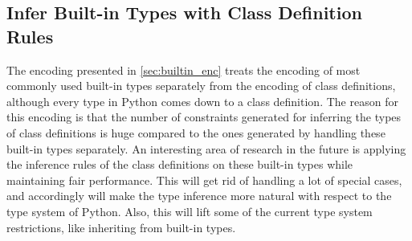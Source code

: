 \subsection{Infer Built-in Types with Class Definition Rules}
The encoding presented in \ref{sec:builtin_enc} treats the encoding of most commonly used built-in types separately from the encoding of class definitions, although every type in Python comes down to a class definition. The reason for this encoding is that the number of constraints generated for inferring the types of class definitions is huge compared to the ones generated by handling these built-in types separately. An interesting area of research in the future is applying the inference rules of the class definitions on these built-in types while maintaining fair performance. This will get rid of handling a lot of special cases, and accordingly will make the type inference more natural with respect to the type system of Python. Also, this will lift some of the current type system restrictions, like inheriting from built-in types.